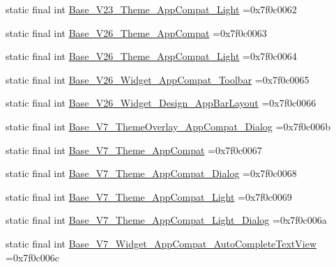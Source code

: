 \begin{DoxyCompactItemize}
static final int \mbox{\hyperlink{classbr_1_1unb_1_1cic_1_1mp_1_1marketmaster_1_1test_1_1R_1_1style_a4e105c2233e95673cba5b105fca1dd1e}{Base\+\_\+\+V23\+\_\+\+Theme\+\_\+\+App\+Compat\+\_\+\+Light}} =0x7f0c0062
\item 
static final int \mbox{\hyperlink{classbr_1_1unb_1_1cic_1_1mp_1_1marketmaster_1_1test_1_1R_1_1style_a4177e84a301894059cc7c0786922980b}{Base\+\_\+\+V26\+\_\+\+Theme\+\_\+\+App\+Compat}} =0x7f0c0063
\item 
static final int \mbox{\hyperlink{classbr_1_1unb_1_1cic_1_1mp_1_1marketmaster_1_1test_1_1R_1_1style_aa81b0a09ed683e1fe896bc7e8e81da63}{Base\+\_\+\+V26\+\_\+\+Theme\+\_\+\+App\+Compat\+\_\+\+Light}} =0x7f0c0064
\item 
static final int \mbox{\hyperlink{classbr_1_1unb_1_1cic_1_1mp_1_1marketmaster_1_1test_1_1R_1_1style_a60773c387828ae63a1cdeab062a185f7}{Base\+\_\+\+V26\+\_\+\+Widget\+\_\+\+App\+Compat\+\_\+\+Toolbar}} =0x7f0c0065
\item 
static final int \mbox{\hyperlink{classbr_1_1unb_1_1cic_1_1mp_1_1marketmaster_1_1test_1_1R_1_1style_aab20a5a6f033362929c0ee581b8b73ec}{Base\+\_\+\+V26\+\_\+\+Widget\+\_\+\+Design\+\_\+\+App\+Bar\+Layout}} =0x7f0c0066
\item 
static final int \mbox{\hyperlink{classbr_1_1unb_1_1cic_1_1mp_1_1marketmaster_1_1test_1_1R_1_1style_a83369a9752c08ab99483bc38c74db8d8}{Base\+\_\+\+V7\+\_\+\+Theme\+Overlay\+\_\+\+App\+Compat\+\_\+\+Dialog}} =0x7f0c006b
\item 
static final int \mbox{\hyperlink{classbr_1_1unb_1_1cic_1_1mp_1_1marketmaster_1_1test_1_1R_1_1style_a39aa9de68e77479ea4210b9f552ffc57}{Base\+\_\+\+V7\+\_\+\+Theme\+\_\+\+App\+Compat}} =0x7f0c0067
\item 
static final int \mbox{\hyperlink{classbr_1_1unb_1_1cic_1_1mp_1_1marketmaster_1_1test_1_1R_1_1style_ae727d791e38d1aa97b3b114795f0fc69}{Base\+\_\+\+V7\+\_\+\+Theme\+\_\+\+App\+Compat\+\_\+\+Dialog}} =0x7f0c0068
\item 
static final int \mbox{\hyperlink{classbr_1_1unb_1_1cic_1_1mp_1_1marketmaster_1_1test_1_1R_1_1style_aff4677677b88b886b4c4e3ef9269134e}{Base\+\_\+\+V7\+\_\+\+Theme\+\_\+\+App\+Compat\+\_\+\+Light}} =0x7f0c0069
\item 
static final int \mbox{\hyperlink{classbr_1_1unb_1_1cic_1_1mp_1_1marketmaster_1_1test_1_1R_1_1style_a87ba43fa582ce98496751784c02df321}{Base\+\_\+\+V7\+\_\+\+Theme\+\_\+\+App\+Compat\+\_\+\+Light\+\_\+\+Dialog}} =0x7f0c006a
\item 
static final int \mbox{\hyperlink{classbr_1_1unb_1_1cic_1_1mp_1_1marketmaster_1_1test_1_1R_1_1style_ab557a4d5e1865e33cc012b9d511aa081}{Base\+\_\+\+V7\+\_\+\+Widget\+\_\+\+App\+Compat\+\_\+\+Auto\+Complete\+Text\+View}} =0x7f0c006c

\end{DoxyCompactItemize}
